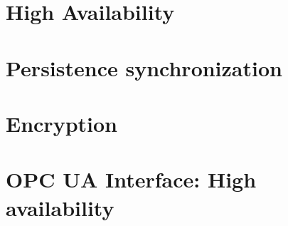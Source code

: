 \section{High Availability}\label{sec:res:ha}

\section{Persistence synchronization}\label{sec:res:psync}

\section{Encryption}\label{sec:res:security}

\section{OPC UA Interface: High availability}\label{sec:res:opc-ua}
